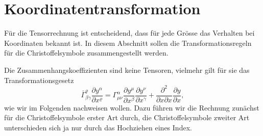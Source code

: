%
%
%
\section{Koordinatentransformation}
Für die Tensorrechnung ist entscheidend, dass für jede Grösse das Verhalten
bei Koordinaten bekannt ist.
In diesem Abschnitt sollen die Transformationsregeln für die
Christoffelsymbole zusammengestellt werden.

Die Zusammenhangskoeffizienten sind keine Tensoren, vielmehr gilt für sie das
Transformationsgesetz
\[
\bar\Gamma^\varrho_{\beta\gamma}
\frac{\partial y^\alpha}{\partial x^\varrho}
=
\Gamma^\alpha_{\mu\nu}
\frac{\partial y^\mu}{\partial x^\beta}
\frac{\partial y^\nu}{\partial x^\gamma}
+
\frac{\partial^2}{\partial x\partial x}
\frac{\partial y}{\partial x},
\]
wie wir im Folgenden nachweisen wollen.
Dazu führen wir die Rechnung zunächst für die Christoffelsymbole
erster Art durch, die Christoffelsymbole zweiter Art unterschieden sich
ja nur durch das Hochziehen eines Index.

